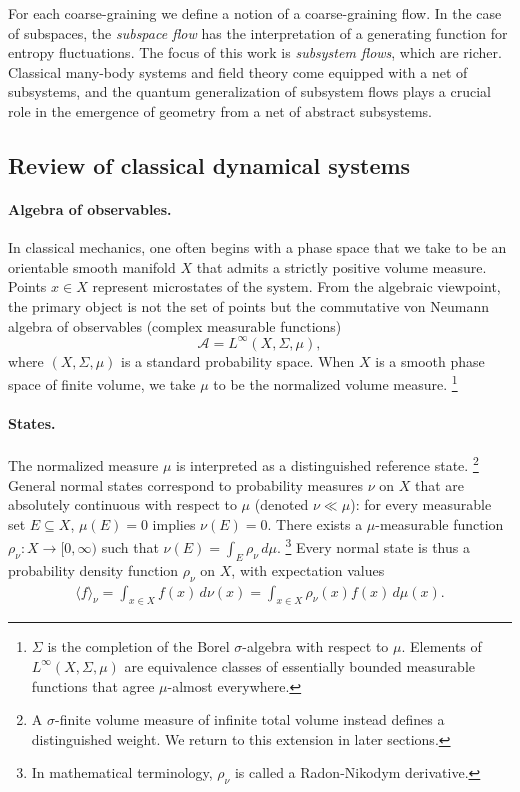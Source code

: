\documentclass[a4paper,11pt]{article}
\theoremstyle{definition}
\theoremstyle{remark}
\newcommand{\mA}{\mathcal{A}}
\begin{document}
For each coarse-graining we define a notion of a coarse-graining flow.  In the case of
subspaces, the \emph{subspace flow} has the interpretation of a generating function for
entropy fluctuations.  The focus of this work is \emph{subsystem flows}, which are
richer.  Classical many-body systems and field theory come equipped with a net of
subsystems, and the quantum generalization of subsystem flows plays a crucial role in
the emergence of geometry from a net of abstract subsystems.
 
\subsection{Review of classical dynamical systems}%
\label{subsec:classical-definitions}
 
\paragraph{Algebra of observables.}
In classical mechanics, one often begins with a phase space that we take to be an
orientable smooth manifold $X$ that admits a strictly positive volume measure.  Points
$x\in X$ represent microstates of the system.  From the algebraic viewpoint, the
primary object is not the set of points but the commutative von Neumann algebra of
observables (complex measurable functions)
\[
\mA=L^\infty(X,\Sigma,\mu),
\]
where $(X,\Sigma,\mu)$ is a standard probability space.  When $X$ is a smooth phase
space of finite volume, we take $\mu$ to be the normalized volume measure.%
\footnote{$\Sigma$ is the completion of the Borel $\sigma$-algebra with respect to
  $\mu$.  Elements of $L^\infty(X,\Sigma,\mu)$ are equivalence classes of essentially
  bounded measurable functions that agree $\mu$-almost everywhere.}
 
\paragraph{States.}
The normalized measure $\mu$ is interpreted as a distinguished reference state.%
\footnote{A $\sigma$-finite volume measure of infinite total volume instead defines a
  distinguished weight.  We return to this extension in later sections.}
General normal states correspond to probability measures $\nu$ on $X$ that are
absolutely continuous with respect to $\mu$ (denoted $\nu\ll \mu$): for every
measurable set $E\subseteq X$, $\mu(E)=0$ implies $\nu(E)=0$.  There exists a
$\mu$-measurable function $\rho_\nu:X\to [0,\infty)$ such that
$\nu(E)=\int_E \rho_\nu\,d\mu$.%
\footnote{In mathematical terminology, $\rho_\nu$ is called a Radon-Nikodym derivative.}
Every normal state is thus a probability density function $\rho_\nu$ on $X$, with
expectation values
\begin{align}
\langle f\rangle_\nu=\int_{x\in X}f(x)\,d\nu(x)=\int_{x\in X} \rho_\nu(x) f(x)\,d\mu(x).
\end{align}
 
\end{document}

